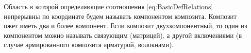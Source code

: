 
Область в которой определяющие соотношения \ref{eq:BasicDefRelations} непрерывны по координате будем называть компонентом композита.
Композит ожет иметь два и более компонент. Если композит двухкомпонентный, то один из компонентом можно называть связующим (матрицей), а другой
включениями (в случае армированного композита арматурой, волокнами).


\clearpage
